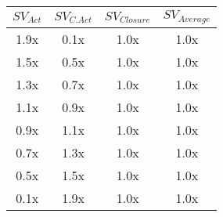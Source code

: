 \begin{table}[h!]
  \begin{center}
    \label{tab:se_t1}
    \begin{tabular}{c|c|c|c}
      \textbf{$SV_{Act}$} & \textbf{$SV_{C.Act}$} & \textbf{$SV_{Closure}$} & \textbf{$SV_{Average}$} \\
      \hline
      1.9x & 0.1x & 1.0x & 1.0x \\
      1.5x & 0.5x & 1.0x & 1.0x \\
      1.3x & 0.7x & 1.0x & 1.0x \\
      1.1x & 0.9x & 1.0x & 1.0x \\
      0.9x & 1.1x & 1.0x & 1.0x \\
      0.7x & 1.3x & 1.0x & 1.0x \\
      0.5x & 1.5x & 1.0x & 1.0x \\
      0.1x & 1.9x & 1.0x & 1.0x \\
      
    \end{tabular}
  \end{center}
\end{table}